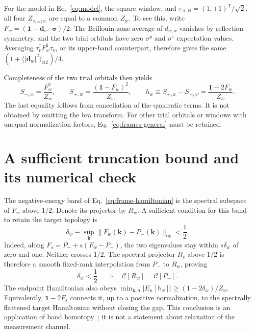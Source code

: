 \documentclass[aps,prb,onecolumn,nofootinbib,superscriptaddress]{revtex4-2}
\newcommand{\id}{\mathbf{1}}
\newcommand{\bk}{\boldsymbol k}
\newcommand{\C}{\mathcal C}
\newcommand{\BZ}{\mathrm{BZ}}
\begin{document}
For the model in Eq.~\eqref{eq:model}, the square window, and $\tau_{A,B}=(1,\pm1)^{\mathsf T}/\sqrt2$, all four $Z_{\nu,\pm;w}$ are equal to a common $Z_w$. To see this, write $F_w=(\id-\boldsymbol d_w\cdot\boldsymbol\sigma)/2$. The Brillouin-zone average of $d_{w,x}$ vanishes by reflection symmetry, and the two trial orbitals have zero $\sigma^y$ and $\sigma^z$ expectation values. Averaging $\tau_\nu^\dagger F_w^2\tau_\nu$, or its upper-band counterpart, therefore gives the same $(1+\langle|\boldsymbol d_w|^2\rangle_{\BZ})/4$.

Completeness of the two trial orbitals then yields
\begin{equation}
 S_{-,w}=\frac{F_w^2}{Z_w},\qquad
 S_{+,w}=\frac{(\id-F_w)^2}{Z_w},\qquad
 h_w\equiv S_{+,w}-S_{-,w}=\frac{\id-2F_w}{Z_w}.
 \label{eq:frame-hamiltonian}
\end{equation}
The last equality follows from cancellation of the quadratic terms. It is not obtained by omitting the bra transform. For other trial orbitals or windows with unequal normalization factors, Eq.~\eqref{eq:frames-general} must be retained.

\section{A sufficient truncation bound and its numerical check}

The negative-energy band of Eq.~\eqref{eq:frame-hamiltonian} is the spectral subspace of $F_w$ above $1/2$. Denote its projector by $R_w$. A sufficient condition for this band to retain the target topology is
\begin{equation}
 \delta_w\equiv\sup_{\bk}\|F_w(\bk)-P_-(\bk)\|_{\mathrm{op}}<\frac12.
 \label{eq:delta}
\end{equation}
Indeed, along $F_s=P_-+s(F_w-P_-)$, the two eigenvalues stay within $s\delta_w$ of zero and one. Neither crosses $1/2$. The spectral projector $R_s$ above $1/2$ is therefore a smooth fixed-rank interpolation from $P_-$ to $R_w$, proving
\begin{equation}
 \boxed{\delta_w<\frac12\quad\Longrightarrow\quad\C[R_w]=\C[P_-].}
 \label{eq:truncation-result}
\end{equation}
The endpoint Hamiltonian also obeys $\min_{\bk,n}|E_n[h_w]|\ge(1-2\delta_w)/Z_w$. Equivalently, $\id-2F_s$ connects it, up to a positive normalization, to the spectrally flattened target Hamiltonian without closing the gap. This conclusion is an application of band homotopy~\cite{Avron1983}; it is not a statement about relaxation of the measurement channel.
\end{document}
